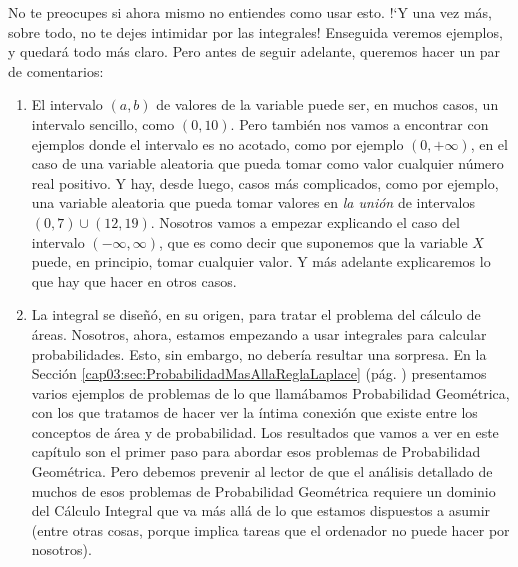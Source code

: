 No te preocupes si ahora mismo no entiendes como usar esto. {!`}Y una vez más, sobre todo, no te dejes intimidar por las integrales! Enseguida veremos ejemplos, y quedará todo más claro. Pero antes de seguir adelante, queremos hacer un par de comentarios:
\begin{enumerate}
  \item El intervalo $(a,b)$ de valores de la variable puede ser, en muchos casos, un intervalo sencillo, como $(0,10)$. Pero también nos vamos a encontrar con ejemplos donde el intervalo es no acotado, como por ejemplo $(0,+\infty)$, en el caso de una variable aleatoria que pueda tomar como valor cualquier número real positivo. Y hay, desde luego, casos más complicados, como por ejemplo, una variable aleatoria que pueda tomar valores en {\em la unión} de intervalos $(0,7) \cup (12,19)$. Nosotros vamos a empezar explicando el caso del intervalo $(-\infty,\infty)$, que es como decir que suponemos que la variable $X$ puede, en principio, tomar cualquier valor. Y más adelante explicaremos lo que hay que hacer en otros casos.
  \item La integral se diseñó, en su origen, para tratar el problema del cálculo de áreas. Nosotros, ahora, estamos empezando a usar integrales para calcular probabilidades. Esto, sin embargo, no debería resultar una sorpresa. En la Sección \ref{cap03:sec:ProbabilidadMasAllaReglaLaplace} (pág. \pageref{cap03:sec:ProbabilidadMasAllaReglaLaplace}) presentamos varios ejemplos de problemas de lo que llamábamos Probabilidad Geométrica, con los que tratamos de hacer ver la íntima conexión que existe entre los conceptos de área y de probabilidad. Los resultados que vamos a ver en este capítulo son el primer paso para abordar esos problemas de Probabilidad Geométrica. Pero debemos prevenir al lector de que el análisis detallado de muchos de esos problemas de Probabilidad Geométrica requiere un dominio del Cálculo Integral que va más allá de lo que estamos dispuestos a asumir (entre otras cosas, porque implica tareas que el ordenador no puede hacer por nosotros).
\end{enumerate}

